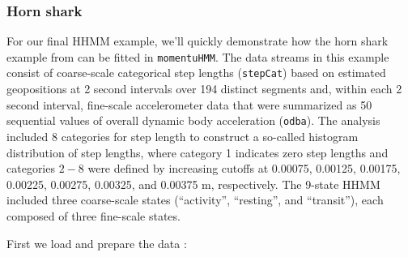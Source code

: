\documentclass[12pt]{article}\usepackage[]{graphicx}\usepackage[]{color}
\begin{document}
\subsubsection{Horn shark}
\label{sec:hornShark}
For our final HHMM example, we'll quickly demonstrate how the horn shark example from \cite{AdamEtAl2019} can be fitted in \verb|momentuHMM|. The data streams in this example consist of coarse-scale categorical step lengths (\verb|stepCat|) based on estimated geopositions at 2 second intervals over 194 distinct segments and, within each 2 second interval, fine-scale accelerometer data that were summarized as 50 sequential values of overall dynamic body acceleration (\verb|odba|). The analysis included 8 categories for step length to construct a so-called histogram distribution of step lengths, where category 1 indicates zero step lengths and categories $2-8$ were defined by increasing cutoffs at 0.00075, 0.00125, 0.00175, 0.00225, 0.00275, 0.00325, and 0.00375 m, respectively. The 9-state HHMM included three coarse-scale states (``activity'', ``resting'', and ``transit''), each composed of three fine-scale states.

First we load and prepare the data \citep[available for download from][]{AdamEtAl2019}:
\end{document}
